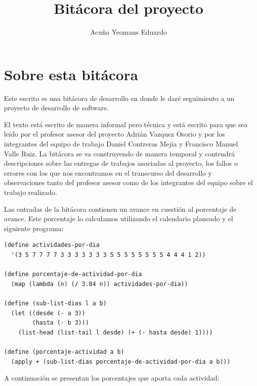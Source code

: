 \documentclass[letterpaper]{article}
\title{Bitácora del proyecto}
\author{Acuña Yeomans Eduardo}
\date{}
\begin{document}
\maketitle

\section{Sobre esta bitácora}
Este escrito es una bitácora de desarrollo en donde le daré seguimiento a un proyecto de desarrollo de software.

El texto está escrito de manera informal pero técnica y está escrito para que sea leído por el profesor asesor del proyecto Adrián Vazquez Osorio y por los integrantes del equipo de trabajo Daniel Contreras Mejía y Francisco Manuel Valle Ruiz. La bitácora se va construyendo de manera temporal y contendrá descripciones sobre las entregas de trabajos asociadas al proyecto, los fallos o errores con los que nos encontramos en el transcurso del desarrollo y observaciones tanto del profesor asesor como de los integrantes del equipo sobre el trabajo realizado.

Las entradas de la bitácora contienen un avance en cuestión al porcentaje de avance.
Este porcentaje lo calculamos utilizando el calendario planeado y el siguiente programa:

\begin{verbatim}
(define actividades-por-dia
  '(3 5 7 7 7 7 3 3 3 3 3 3 3 5 5 5 5 5 5 5 5 4 4 4 1 2))

(define porcentaje-de-actividad-por-dia
  (map (lambda (n) (/ 3.84 n)) actividades-por-dia))

(define (sub-list-dias l a b)
  (let ((desde (- a 3))
        (hasta (- b 3)))
    (list-head (list-tail l desde) (+ (- hasta desde) 1))))

(define (porcentaje-actividad a b)
  (apply + (sub-list-dias porcentaje-de-actividad-por-dia a b)))
\end{verbatim}

A continuación se presentan los porcentajes que aporta cada actividad:
\end{document}
